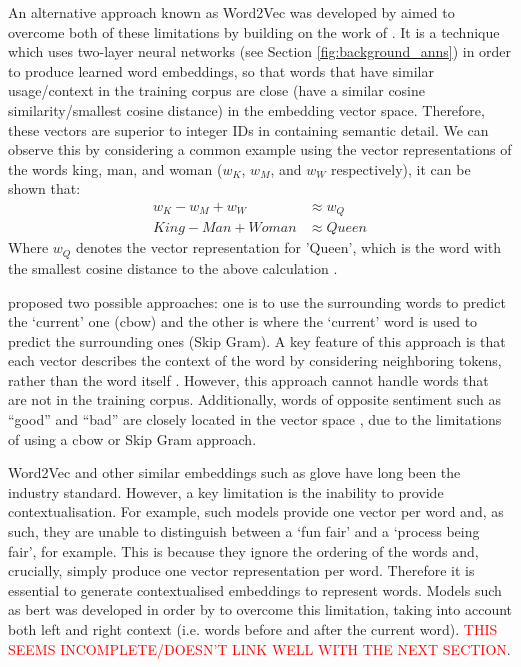 An alternative approach known as Word2Vec was developed by \citet{mikolov2013efficient} aimed to overcome both of these limitations by building on the work of \citet{bengio2000neural}. It is a technique which uses two-layer neural networks (see Section \ref{fig:background_anns}) in order to produce learned word embeddings, so that words that have similar usage/context in the training corpus are close (have a similar cosine similarity/smallest cosine distance) in the embedding vector space. Therefore, these vectors are superior to integer IDs in containing semantic detail. We can observe this by considering a common example using the vector representations of the words king, man, and woman ($w_K$, $w_M$, and $w_W$ respectively), it can be shown that:
\begin{equation*}
    \begin{aligned}
        w_K - w_M + w_W &\approx w_Q \\
        King - Man + Woman &\approx Queen
    \end{aligned}
\end{equation*}
Where $w_Q$ denotes the vector representation for 'Queen', which is the word with the smallest cosine distance to the above calculation \citep{allen2019analogies}.

\cite{mikolov2013efficient} proposed two possible approaches: one is to use the surrounding words to predict the `current' one (\acrfull{cbow}) and the other is where the `current' word is used to predict the surrounding ones (Skip Gram). A key feature of this approach is that each vector describes the context of the word by considering neighboring tokens, rather than the word itself \citep{li2018introduction}. However, this approach cannot handle words that are not in the training corpus. Additionally, words of opposite sentiment such as “good” and “bad” are closely located in the vector space \citep{sivakumar2020review}, due to the limitations of using a \acrshort{cbow} or Skip Gram approach.


Word2Vec and other similar embeddings such as \acrshort{glove} \citep{Pennington} have long been the industry standard. However, a key limitation is the inability to provide contextualisation. For example, such models provide one vector per word and, as such, they are unable to distinguish between a `fun fair' and a `process being fair', for example. This is because they ignore the ordering of the words and, crucially, simply produce one vector representation per word. Therefore it is essential to generate contextualised embeddings to represent words. Models such as \acrfull{bert} was developed in order by \citet{devlin2019bert} to overcome this limitation, taking into account both left and right context (i.e. words before and after the current word). \textcolor{red}{THIS SEEMS INCOMPLETE/DOESN'T LINK WELL WITH THE NEXT SECTION}.

